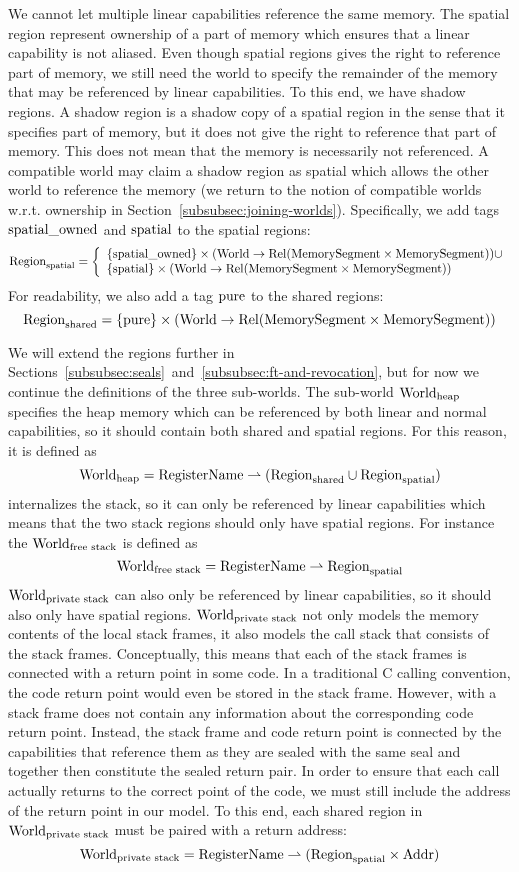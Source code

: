 \begin{jversion}
We cannot let multiple linear capabilities reference the same memory.
The spatial region represent ownership of a part of memory which ensures that a linear capability is not aliased.
Even though spatial regions gives the right to reference part of memory, we still need the world to specify the remainder of the memory that may be referenced by linear capabilities.
To this end, we have shadow regions.
A shadow region is a shadow copy of a spatial region in the sense that it specifies part of memory, but it does not give the right to reference that part of memory.
This does not mean that the memory is necessarily not referenced.
A compatible world may claim a shadow region as spatial which allows the other world to reference the memory (we return to the notion of compatible worlds w.r.t. ownership in Section~\ref{subsubsec:joining-worlds}).
Specifically, we add tags $\mathrm{spatial\_owned}$ and $\mathrm{spatial}$ to the spatial regions:
\[
  \mathrm{Region}_\mathrm{spatial} = \left\{
  \begin{array}{l}
    \{\mathrm{spatial\_owned} \} \times (\mathrm{World} \rightarrow \mathrm{Rel}(\mathrm{MemorySegment} \times \mathrm{MemorySegment})) \cup \\ 
    \{\mathrm{spatial} \} \times (\mathrm{World} \rightarrow \mathrm{Rel}(\mathrm{MemorySegment} \times \mathrm{MemorySegment}))  \\
  \end{array} \right.
\]
For readability, we also add a tag $\mathrm{pure}$ to the shared regions:
\[
  \mathrm{Region}_\mathrm{shared} = \{\mathrm{pure} \} \times (\mathrm{World} \rightarrow \mathrm{Rel}(\mathrm{MemorySegment} \times \mathrm{MemorySegment})) 
\]

We will extend the regions further in Sections~\ref{subsubsec:seals}~and~\ref{subsubsec:ft-and-revocation}, but for now we continue the definitions of the three sub-worlds.
The sub-world $\mathrm{World}_\mathrm{heap}$ specifies the heap memory which can be referenced by both linear and normal capabilities, so it should contain both shared and spatial regions.
For this reason, it is defined as
\[
  \mathrm{World}_\mathrm{heap} = \mathrm{RegisterName} \rightharpoonup (\mathrm{Region}_\mathrm{shared} \cup \mathrm{Region}_\mathrm{spatial})
\]
\srccm{} internalizes the \stktokens{} stack, so it can only be referenced by linear capabilities which means that the two stack regions should only have spatial regions.
For instance the $\mathrm{World}_\text{free stack}$ is defined as
\[
  \mathrm{World}_\text{free stack} = \mathrm{RegisterName} \rightharpoonup \mathrm{Region}_\mathrm{spatial}
\]
$\mathrm{World}_\text{private stack}$ can also only be referenced by linear capabilities, so it should also only have spatial regions.
$\mathrm{World}_\text{private stack}$ not only models the memory contents of the local stack frames, it also models the call stack that consists of the stack frames.
Conceptually, this means that each of the stack frames is connected with a return point in some code.
In a traditional C calling convention, the code return point would even be stored in the stack frame.
However, with \stktokens{} a stack frame does not contain any information about the corresponding code return point.
Instead, the stack frame and code return point is connected by the capabilities that reference them as they are sealed with the same seal and together then constitute the sealed return pair.
In order to ensure that each call actually returns to the correct point of the code, we must still include the address of the return point in our model.
To this end, each shared region in $\mathrm{World}_\text{private stack}$ must be paired with a return address:
\[
\mathrm{World}_\text{private stack} = \mathrm{RegisterName} \rightharpoonup (\mathrm{Region}_\mathrm{spatial} \times \mathrm{Addr})
\]


\end{jversion}
